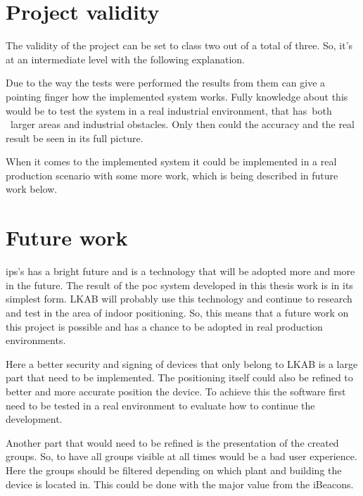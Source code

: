 \section{Project validity}\label{sec:conclusionProjectValidity}
The validity of the project can be set to class two out of a total of three.
So, it's at an intermediate level with the following explanation.

\bigskip

Due to the way the tests were performed the results from them can give a pointing finger how the implemented system works.
Fully knowledge about this would be to test the system in a real industrial environment, that has both  larger areas and industrial obstacles.
Only then could the accuracy and the real result be seen in its full picture.

\bigskip

When it comes to the implemented system it could be implemented in a real production scenario with some more work, which is being described in future work below.


\section{Future work}\label{sec:conclusionFutureWork}
\Acrshort{ips}'s has a bright future and is a technology that will be adopted more and more in the future.
The result of the \acrshort{poc} system developed in this thesis work is in its simplest form.
LKAB will probably use this technology and continue to research and test in the area of indoor positioning.
So, this means that a future work on this project is possible and has a chance to be adopted in real production environments.

\bigskip

Here a better security and signing of devices that only belong to LKAB is a large part that need to be implemented.
The positioning itself could also be refined to better and more accurate position the device. 
To achieve this the software first need to be tested in a real environment to evaluate how to continue the development.

\bigskip

Another part that would need to be refined is the presentation of the created groups.
So, to have all groups visible at all times would be a bad user experience.
Here the groups should be filtered depending on which plant and building the device is located in.
This could be done with the major value from the iBeacons.

